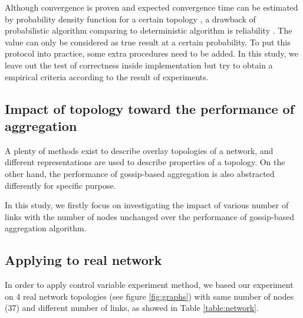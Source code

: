 Although convergence is proven and expected convergence time can be estimated by probability density function for a certain topology \cite{5929538}, a drawback of probabilistic algorithm comparing to deterministic algorithm is reliability \cite{Lynch:1996:DA:525656}. The value can only be considered as true result at a certain probability. To put this protocol into practice, some extra procedures need to be added. In this study, we leave out the test of correctness inside implementation but try to obtain a empirical criteria according to the result of experiments.

\subsection{Impact of topology toward the performance of aggregation}
A plenty of methods exist to describe overlay topologies of a network, and different representations are used to describe properties of a topology. On the other hand, the performance of gossip-based aggregation is also abstracted differently for specific purpose.

In this study, we firstly focus on investigating the impact of various number of links with the number of nodes unchanged over the performance of gossip-based aggregation algorithm. %

\subsection{Applying to real network}
In order to apply control variable experiment method, we based our experiment on 4 real network topologies (see figure \ref{fig:graphs}) with same number of nodes (37) and different number of links, as showed in Table \ref{table:network}. %

